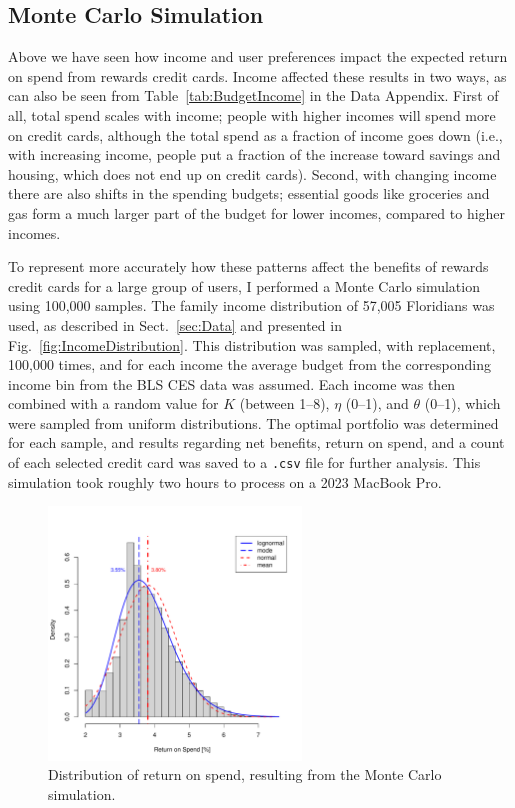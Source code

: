 \subsection{Monte Carlo Simulation}

Above we have seen how income and user preferences impact the expected return on spend from rewards credit cards.
Income affected these results in two ways, as can also be seen from Table~\ref{tab:BudgetIncome} in the Data Appendix.
First of all, total spend scales with income; people with higher incomes will spend more on credit cards, although the total spend as a fraction of income goes down (i.e., with increasing income, people put a fraction of the increase toward savings and housing, which does not end up on credit cards).
Second, with changing income there are also shifts in the spending budgets; essential goods like groceries and gas form a much larger part of the budget for lower incomes, compared to higher incomes. 

To represent more accurately how these patterns affect the benefits of rewards credit cards for a large group of users, I performed a Monte Carlo simulation using 100,000 samples. 
The family income distribution of 57,005 Floridians was used, as described in Sect.~\ref{sec:Data} and presented in Fig.~\ref{fig:IncomeDistribution}.
This distribution was sampled, with replacement, 100,000 times, and for each income the  average budget from the corresponding income bin from the BLS CES data was assumed. 
Each income was then combined with a random value for $K$ (between 1--8), $\eta$ (0--1), and $\theta$ (0--1), which were sampled from uniform distributions.
The optimal portfolio was determined for each sample, and results regarding net benefits, return on spend, and a count of each selected credit card was saved to a \texttt{.csv} file for further analysis. 
This simulation took roughly two hours to process on a 2023 MacBook Pro.

\begin{figure}[t!bh]
    \begin{center}
    \includegraphics[width=0.6\textwidth]{../Figures/MC_ROS_Histogram.pdf}
    \caption{Distribution of return on spend, resulting from the Monte Carlo simulation.}
    \label{fig:MC_ROS_Histogram}
    \end{center}
\end{figure}

